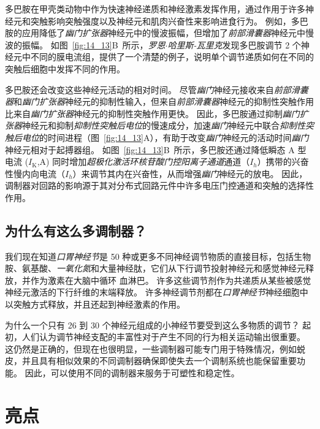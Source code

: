 多巴胺在甲壳类动物中作为快速神经递质和神经激素发挥作用，通过作用于许多神经元和突触影响突触强度以及神经元和肌肉兴奋性来影响进食行为。
例如，多巴胺的应用降低了\textit{幽门扩张器}神经元中的慢波振幅，但增加了\textit{前部滑囊器}神经元中慢波的振幅。
如图~\ref{fig:14_13}B~所示，\textit{罗恩$\cdot$哈里斯-瓦里克}发现多巴胺调节 2 个神经元中不同的膜电流组，提供了一个清楚的例子，说明单个调节递质如何在不同的突触后细胞中发挥不同的作用。


多巴胺还会改变这些神经元活动的相对时间。
尽管\textit{幽门}神经元接收来自\textit{前部滑囊器}和\textit{幽门扩张器}神经元的抑制性输入，但来自\textit{前部滑囊器}神经元的抑制性突触作用比来自\textit{幽门扩张器}神经元的抑制性突触作用更快。
因此，多巴胺通过抑制\textit{幽门扩张器}神经元和抑制\textit{抑制性突触后电位}的慢速成分，加速\textit{幽门}神经元中联合\textit{抑制性突触后电位}的时间进程（图~\ref{fig:14_13}A），有助于改变\textit{幽门}神经元的活动时间\textit{幽门}神经元相对于起搏器组。
如图~\ref{fig:14_13}B~所示，多巴胺还通过降低瞬态 A 型电流 ($I_\text{K}$,A) 同时增加\textit{超极化激活环核苷酸门控阳离子通道}通道（$I_h$）携带的兴奋性慢内向电流（$I_h$）来调节其内在兴奋性，从而增强\textit{幽门}神经元的放电。
因此，调制器对回路的影响源于其对分布式回路元件中许多电压门控通道和突触的选择性作用。



\subsection{为什么有这么多调制器？}

我们现在知道\textit{口胃神经节}是 50 种或更多不同神经调节物质的直接目标，包括生物胺、氨基酸、\textit{一氧化氮}和大量神经肽，它们从下行调节投射神经元和感觉神经元释放，并作为激素在大脑中循环 血淋巴。
许多这些调节剂作为共递质从某些被感觉神经元激活的下行纤维的末端释放。
许多神经调节剂都在\textit{口胃神经节}神经细胞中以突触方式释放，并且还起到神经激素的作用。


为什么一个只有 26 到 30 个神经元组成的小神经节要受到这么多物质的调节？
起初，人们认为调节神经支配的丰富性对于产生不同的行为相关运动输出很重要。
这仍然是正确的，但现在也很明显，一些调制器可能专门用于特殊情况，例如蜕皮，并且具有相似效果的不同调制器确保即使失去一个调制系统也能保留重要功能。
因此，可以使用不同的调制器来服务于可塑性和稳定性。



\section{亮点}

